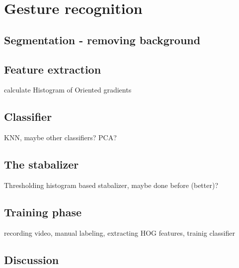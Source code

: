 \chapter{Gesture recognition}
\label{ch:gestures}


\section{Segmentation - removing background}

\section{Feature extraction}
calculate Histogram of Oriented gradients\cite{watanabe2009}

\section{Classifier}
KNN, maybe other classifiers? PCA?

\section{The stabalizer}
Thresholding histogram based stabalizer, maybe done before (better)?

\section{Training phase}
recording video, manual labeling, extracting HOG features, trainig classifier

\section{Discussion}